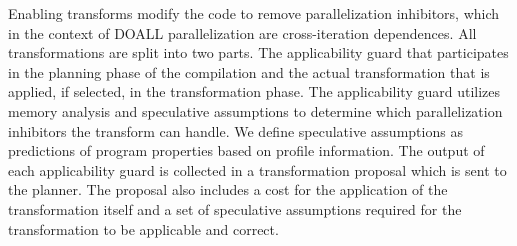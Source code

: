 Enabling transforms modify the code to remove parallelization
inhibitors, which in the context of DOALL parallelization are
cross-iteration dependences.
%
All transformations are split into two parts. The applicability guard
that participates in the planning phase of the compilation and the
actual transformation that is applied, if selected, in the
transformation phase.
The applicability guard utilizes memory analysis and speculative
assumptions to determine which parallelization inhibitors the
transform can handle.
%
We define speculative assumptions as predictions of program properties
based on profile information.
%
%
The output of each applicability guard is collected in a
transformation proposal which is sent to the planner.
%
%
The proposal also includes a cost for the application of the
transformation itself and a set of speculative assumptions required
for the transformation to be applicable and correct.
%



%



%
%


%
%
%

